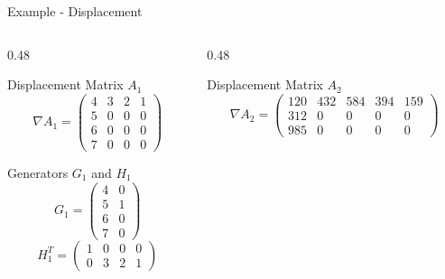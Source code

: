 \begin{frame}{Example - Displacement}
  \begin{columns}[t]

    \begin{column}{0.48\textwidth}
      \begin{block}{Displacement Matrix $A_1$}
        {\footnotesize
          \[
            \nabla A_{1} =
            \begin{pmatrix}
              4 & 3 & 2 & 1 \\
              5 & 0 & 0 & 0 \\
              6 & 0 & 0 & 0 \\
              7 & 0 & 0 & 0
            \end{pmatrix}
          \]
        }
      \end{block}

      \begin{block}{Generators $G_1$ and $H_1$}
        {\footnotesize
          \[
            G_1 =
            \begin{pmatrix}
              4 & 0 \\
              5 & 1 \\
              6 & 0 \\
              7 & 0
            \end{pmatrix}
          \]
          \[
            H_1^{T} =
            \begin{pmatrix}
              1 & 0 & 0 & 0 \\
              0 & 3 & 2 & 1
            \end{pmatrix}
          \]
        }
      \end{block}
    \end{column}

    \begin{column}{0.48\textwidth}
      \begin{block}{Displacement Matrix $A_2$}
        {\footnotesize
          \[
            \nabla A_{2} =
            \begin{pmatrix}
              120 & 432 & 584 & 394 & 159 \\
              312 & 0   & 0   & 0   & 0   \\
              985 & 0   & 0   & 0   & 0
            \end{pmatrix}
          \]
        }
      \end{block}


\end{column}
\end{columns}
\end{frame}
